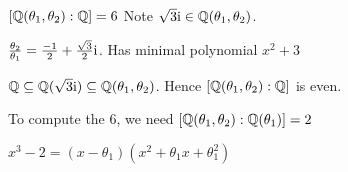 \documentclass[notes.tex]{subfiles}
\begin{document}
\begin{eg}
	$[\mathbb{Q}(\theta_1, \theta_2):\mathbb{Q}] = 6$
	Note $\sqrt{3}\mathrm{i}\in\mathbb{Q}(\theta_1, \theta_2)$.

	$\frac{\theta_2}{\theta_1} = \frac{-1}{2} + \frac{\sqrt{3}}{2}\mathrm{i}$. Has minimal polynomial $x^2+3$

	$\mathbb{Q}\subseteq \mathbb{Q}(\sqrt{3}\mathrm{i})\subseteq\mathbb{Q}(\theta_1, \theta_2)$.
	Hence $[\mathbb{Q}(\theta_1, \theta_2):\mathbb{Q}]$ is even.

	To compute the 6, we need $[\mathbb{Q}(\theta_1, \theta_2):\mathbb{Q}(\theta_1)] = 2$

	$x^3 -2 = (x-\theta_1)(x^2+\theta_1x+\theta_1^2)$
\end{eg}
\end{document}
